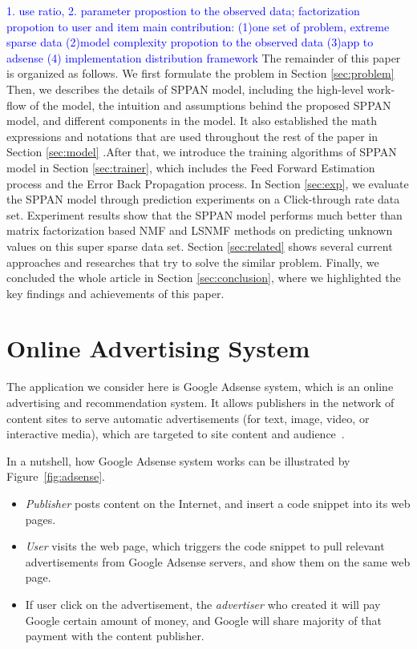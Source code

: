 \documentclass[conference,compsoc]{IEEEtran}
\begin{document}
\textcolor{blue}{ 1. use ratio, 2. parameter propostion to the observed data; factorization propotion to user and item
main contribution: (1)one set of problem, extreme sparse data (2)model complexity propotion to the observed data (3)app to adsense (4) implementation distribution framework
}
The remainder of this paper is organized as follows. We first formulate the problem in Section \ref{sec:problem}   Then, we describes the details of SPPAN model, including the high-level work-flow of the model, the intuition and assumptions behind the proposed SPPAN model, and different components in the model. It also established the math expressions and notations that are used throughout the rest of the paper in Section \ref{sec:model} .After that, we introduce the training algorithms of SPPAN model in Section \ref{sec:trainer}, which includes the Feed Forward Estimation process and the Error Back Propagation process. In Section \ref{sec:exp}, we evaluate the SPPAN model through prediction experiments on a Click-through rate data set. Experiment results show that the SPPAN model performs much better than matrix factorization based NMF and LSNMF methods on predicting unknown values on this super sparse data set. Section \ref{sec:related} shows several current approaches and researches that try to solve the similar problem. Finally, we concluded the whole article in Section \ref{sec:conclusion}, where we highlighted the key findings and achievements of this paper.


%
\section{Online Advertising System}
\label{sec:intro}

The application we consider here is Google Adsense system, which is an online advertising and recommendation system. It allows publishers in the network of content sites to serve automatic advertisements (for text, image, video, or interactive media), which are targeted to site content and audience~\cite{adsense:wiki}.  


In a nutshell, how Google Adsense system works can be illustrated by Figure~\ref{fig:adsense}.
\begin{itemize} \itemsep -2pt
\item {\em Publisher} posts content on the Internet, and insert a code snippet into its web pages.
\item {\em User} visits the web page, which triggers the code snippet to pull relevant advertisements from Google Adsense servers, and show them on the same web page.
\item If user click on the advertisement, the {\em advertiser} who created it will pay Google certain amount of money, and Google will share majority of that payment with the content publisher.
\end{itemize}
\end{document}
